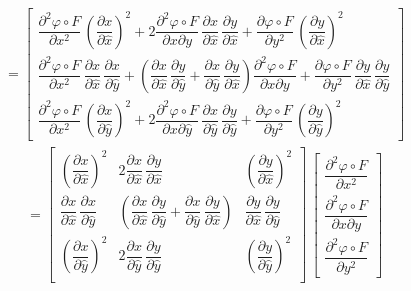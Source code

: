 \begin{align*}
  &= \begin{bmatrix}
    \dfrac{\partial^2 \varphi\circ F}{\partial x^2}\, \left(\dfrac{\partial
      x}{\partial \hat{x}}\right)^2 + 2 \dfrac{\partial^2 \varphi\circ F}{\partial x
      \partial y} \, \dfrac{\partial x}{\partial \hat{x}} \,
      \dfrac{\partial y}{\partial \hat{x}} + \dfrac{\partial \varphi\circ
      F}{\partial y^2}\, \left(\dfrac{\partial y}{\partial \hat{x}}\right)^2 \\[1em]
    \dfrac{\partial^2 \varphi\circ F}{\partial x^2}\, \dfrac{\partial
      x}{\partial \hat{x}}\, \dfrac{\partial x}{\partial \hat{y}} + \left(
      \dfrac{\partial x}{\partial \hat{x}}\, \dfrac{\partial y}{\partial
      \hat{y}} + \dfrac{\partial x}{\partial \hat{y}}\,
      \dfrac{\partial y}{\partial \hat{x}} \right) \dfrac{\partial^2 \varphi\circ F}{\partial x
      \partial y} + \dfrac{\partial \varphi\circ F}{\partial y^2}\,
      \dfrac{\partial y}{\partial \hat{x}} \, \dfrac{\partial y}{\partial
      \hat{y}} \\[1em]
    \dfrac{\partial^2 \varphi\circ F}{\partial x^2}\, \left(\dfrac{\partial
      x}{\partial \hat{y}}\right)^2 + 2 \dfrac{\partial^2 \varphi\circ F}{\partial x
      \partial \hat{y}} \, \dfrac{\partial x}{\partial \hat{y}} \,
      \dfrac{\partial y}{\partial \hat{y}} + \dfrac{\partial \varphi\circ
      F}{\partial y^2}\, \left(\dfrac{\partial y}{\partial \hat{y}}\right)^2
  \end{bmatrix}
\end{align*}
\begin{align*}
  &= \begin{bmatrix}
    \left(\dfrac{\partial x}{\partial \hat{x}}\right)^2
      & 2 \dfrac{\partial x}{\partial \hat{x}}\, \dfrac{\partial y}{\partial \hat{x}}
      & \left(\dfrac{\partial y}{\partial \hat{x}}\right)^2 \\[1em]
    \dfrac{\partial x}{\partial \hat{x}}\, \dfrac{\partial x}{\partial \hat{y}}
      & \left(\dfrac{\partial x}{\partial \hat{x}}\, \dfrac{\partial y}{\partial
      \hat{y}} + \dfrac{\partial x}{\partial \hat{y}}\,
      \dfrac{\partial y}{\partial \hat{x}} \right)
      & \dfrac{\partial y}{\partial \hat{x}} \, \dfrac{\partial y}{\partial \hat{y}} \\[1em]
    \left(\dfrac{\partial x}{\partial \hat{y}}\right)^2
      & 2 \dfrac{\partial x}{\partial \hat{y}}\, \dfrac{\partial y}{\partial \hat{y}}
      & \left(\dfrac{\partial y}{\partial \hat{y}}\right)^2 \\[1em]
  \end{bmatrix}\, \begin{bmatrix}
    \dfrac{\partial^2 \varphi\circ F}{\partial x^2} \\[1em]
    \dfrac{\partial^2 \varphi\circ F}{\partial x \partial y} \\[1em]
    \dfrac{\partial^2 \varphi\circ F}{\partial y^2}
  \end{bmatrix}
\end{align*}
